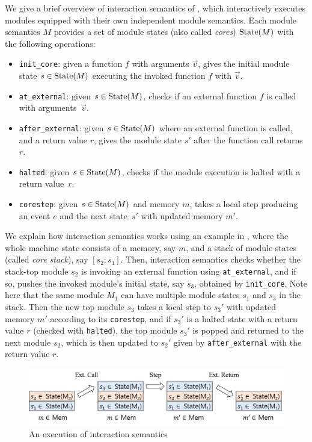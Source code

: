 We give a brief overview of interaction semantics of \ccc{}, which
interactively executes modules equipped with their own independent
module semantics. Each module semantics $M$ provides
a set of module states (also called \emph{cores}) $\textrm{State}(M)$ with the following operations:
\begin{itemize}
\item \texttt{init\_core}: given a function $f$ with arguments $\vec{v}$,
  gives the initial module state $s \in \textrm{State}(M)$
  executing the invoked function $f$ with $\vec{v}$.
\item \texttt{at\_external}: given $s \in \textrm{State}(M)$,
  checks if an external function $f$ is called with arguments~$\vec{v}$.
\item \texttt{after\_external}: given $s \in \textrm{State}(M)$
  where an external function is called,
  and a return value $r$,
  gives the module state $s'$
  after the function call returns $r$.
\item \texttt{halted}: given $s \in \textrm{State}(M)$, checks if the module execution is halted with a return value~$r$.
\item \texttt{corestep}: given $s \in \textrm{State}(M)$ and memory $m$, takes a local step producing an event $e$ and the next state~$s'$ with updated memory $m'$.
\end{itemize}

We explain how interaction semantics works using an example in
, where the whole machine state consists of a
memory, say $m$, and a stack of module states (called \emph{core stack}), say $[s_2; s_1]$.
Then, interaction semantics checks whether the stack-top module $s_2$
is invoking an external function using \texttt{at\_external}, and if
so, pushes the invoked module's initial state, say $s_3$, obtained by
\texttt{init\_core}. Note here that the same module $M_1$ can have
multiple module states $s_1$ and $s_3$ in the stack.  Then the
new top module $s_3$ takes a local step to $s_3'$ with updated memory
$m'$ according to its \texttt{corestep}, and if $s_3'$ is a halted
state with a return value $r$ (checked with \texttt{halted}), the top
module $s_3'$ is popped and returned to the next module $s_2$, which
is then updated to $s_2'$ given by \texttt{after\_external} with the return
value $r$.

\begin{figure}[t]
\includegraphics[width=0.9\linewidth]{images/intersem.png}
\caption{An execution of interaction semantics}
\label{fig:inter-sem}
\end{figure}

